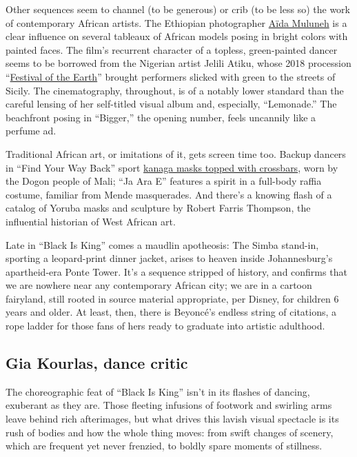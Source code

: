 Other sequences seem to channel (to be generous) or crib (to be less so)
the work of contemporary African artists. The Ethiopian photographer
\href{https://www.theatlantic.com/magazine/archive/2019/06/aida-muluneh-the-world-is-9/588061/}{Aïda
Muluneh} is a clear influence on several tableaux of African models
posing in bright colors with painted faces. The film's recurrent
character of a topless, green-painted dancer seems to be borrowed from
the Nigerian artist Jelili Atiku, whose 2018 procession
``\href{http://m12.manifesta.org/festino-della-terra-alaraagbo-xiii-2018/}{Festival
of the Earth}'' brought performers slicked with green to the streets of
Sicily. The cinematography, throughout, is of a notably lower standard
than the careful lensing of her self-titled visual album and,
especially, ``Lemonade.'' The beachfront posing in ``Bigger,'' the
opening number, feels uncannily like a perfume ad.

Traditional African art, or imitations of it, gets screen time too.
Backup dancers in ``Find Your Way Back'' sport
\href{https://www.metmuseum.org/art/collection/search/315061}{kanaga
masks topped with crossbars}, worn by the Dogon people of Mali; ``Ja Ara
E'' features a spirit in a full-body raffia costume, familiar from Mende
masquerades. And there's a knowing flash of a catalog of Yoruba masks
and sculpture by Robert Farris Thompson, the influential historian of
West African art.

Late in ``Black Is King'' comes a maudlin apotheosis: The Simba
stand-in, sporting a leopard-print dinner jacket, arises to heaven
inside Johannesburg's apartheid-era Ponte Tower. It's a sequence
stripped of history, and confirms that we are nowhere near any
contemporary African city; we are in a cartoon fairyland, still rooted
in source material appropriate, per Disney, for children 6 years and
older. At least, then, there is Beyoncé's endless string of citations, a
rope ladder for those fans of hers ready to graduate into artistic
adulthood.

\hypertarget{gia-kourlas-dance-critic}{%
\subsection{Gia Kourlas, dance critic}\label{gia-kourlas-dance-critic}}

The choreographic feat of ``Black Is King'' isn't in its flashes of
dancing, exuberant as they are. Those fleeting infusions of footwork and
swirling arms leave behind rich afterimages, but what drives this lavish
visual spectacle is its rush of bodies and how the whole thing moves:
from swift changes of scenery, which are frequent yet never frenzied, to
boldly spare moments of stillness.

